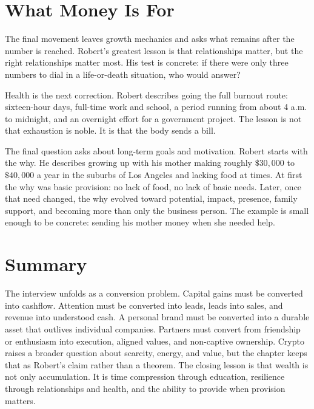 \section{What Money Is For}

The final movement leaves growth mechanics and asks what remains after the number is reached. Robert's greatest lesson is that relationships matter, but the right relationships matter most. His test is concrete: if there were only three numbers to dial in a life-or-death situation, who would answer?

Health is the next correction. Robert describes going the full burnout route: sixteen-hour days, full-time work and school, a period running from about 4 a.m. to midnight, and an overnight effort for a government project. The lesson is not that exhaustion is noble. It is that the body sends a bill.

The final question asks about long-term goals and motivation. Robert starts with the why. He describes growing up with his mother making roughly \( \$30{,}000 \) to \( \$40{,}000 \) a year in the suburbs of Los Angeles and lacking food at times. At first the why was basic provision: no lack of food, no lack of basic needs. Later, once that need changed, the why evolved toward potential, impact, presence, family support, and becoming more than only the business person. The example is small enough to be concrete: sending his mother money when she needed help.

\section{Summary}

The interview unfolds as a conversion problem. Capital gains must be converted into cashflow. Attention must be converted into leads, leads into sales, and revenue into understood cash. A personal brand must be converted into a durable asset that outlives individual companies. Partners must convert from friendship or enthusiasm into execution, aligned values, and non-captive ownership. Crypto raises a broader question about scarcity, energy, and value, but the chapter keeps that as Robert's claim rather than a theorem. The closing lesson is that wealth is not only accumulation. It is time compression through education, resilience through relationships and health, and the ability to provide when provision matters.